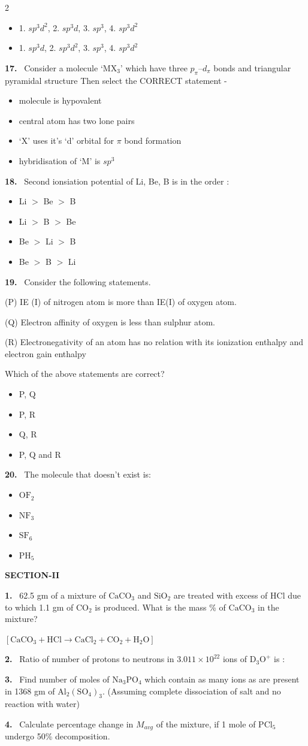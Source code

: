 \documentclass[10pt]{extarticle}
\newcommand{\sect}[1]{\par\smallskip\noindent\textbf{#1}\par}
\newcommand{\qn}[1]{\par\smallskip\noindent\textbf{#1.}~}
\newenvironment{qoptions}{\begin{itemize}[leftmargin=1.8em,itemsep=1pt,topsep=2pt,label={}]}{\end{itemize}}
\newcommand{\opt}[2]{\item[(#1)] #2}
\begin{document}
\begin{multicols}{2}
\begin{qoptions}
\opt{C}{1. $sp^3d^2$, 2. $sp^3d$, 3. $sp^3$, 4. $sp^3d^2$}
\opt{D}{1. $sp^3d$, 2. $sp^3d^2$, 3. $sp^3$, 4. $sp^3d^2$}
\end{qoptions}
\qn{17} Consider a molecule `$\mathrm{MX_3}$' which have three $p_\pi$--$d_\pi$ bonds and triangular pyramidal structure Then select the CORRECT statement -\par
[`X' belongs to `p' block, consider no co-ordinate bond is present in molecule]
\begin{qoptions}
\opt{A}{molecule is hypovalent}
\opt{B}{central atom has two lone pairs}
\opt{C}{`X' uses it's `d' orbital for $\pi$ bond formation}
\opt{D}{hybridisation of `M' is $sp^3$}
\end{qoptions}
\qn{18} Second ionsiation potential of Li, Be, B is in the order :
\begin{qoptions}
\opt{A}{Li $>$ Be $>$ B}
\opt{B}{Li $>$ B $>$ Be}
\opt{C}{Be $>$ Li $>$ B}
\opt{D}{Be $>$ B $>$ Li}
\end{qoptions}
\qn{19} Consider the following statements.\par
(P) IE (I) of nitrogen atom is more than IE(I) of oxygen atom.\par
(Q) Electron affinity of oxygen is less than sulphur atom.\par
(R) Electronegativity of an atom has no relation with its ionization enthalpy and electron gain enthalpy\par
Which of the above statements are correct?
\begin{qoptions}
\opt{A}{P, Q}
\opt{B}{P, R}
\opt{C}{Q, R}
\opt{D}{P, Q and R}
\end{qoptions}
\qn{20} The molecule that doesn't exist is:
\begin{qoptions}
\opt{A}{$\mathrm{OF_2}$}
\opt{B}{$\mathrm{NF_3}$}
\opt{C}{$\mathrm{SF_6}$}
\opt{D}{$\mathrm{PH_5}$}
\end{qoptions}
\sect{SECTION-II}
\qn{1} 62.5 gm of a mixture of $\mathrm{CaCO_3}$ and $\mathrm{SiO_2}$ are treated with excess of HCl due to which 1.1 gm of $\mathrm{CO_2}$ is produced. What is the mass \% of $\mathrm{CaCO_3}$ in the mixture?\par
$[\mathrm{CaCO_3+HCl\to CaCl_2+CO_2+H_2O}]$
\qn{2} Ratio of number of protons to neutrons in $3.011\times10^{22}$ ions of $\mathrm{D_3O^+}$ is :
\qn{3} Find number of moles of $\mathrm{Na_3PO_4}$ which contain as many ions as are present in 1368 gm of $\mathrm{Al_2(SO_4)_3}$. (Assuming complete dissociation of salt and no reaction with water)
\qn{4} Calculate percentage change in $M_{avg}$ of the mixture, if 1 mole of $\mathrm{PCl_5}$ undergo 50\% decomposition.\par

\end{multicols}
\end{document}

